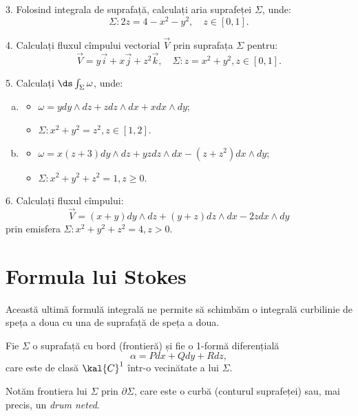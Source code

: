 3. Folosind integrala de suprafață, calculați aria suprafeței $ \Sigma $, unde:
\[
  \Sigma : 2z = 4 - x^2 - y^2, \quad z \in [0, 1].
\]

\vspace{0.5cm}

4. Calculați fluxul cîmpului vectorial $ \vec{V} $ prin suprafața $ \Sigma $
pentru:
\[
  \vec{V} = y\vec{i} + x\vec{j} + z^2 \vec{k}, \quad %
  \Sigma : z = x^2 + y^2, z \in [0, 1].
\]

\vspace{0.5cm}

5. Calculați $ \ds\int_\Sigma \omega $, unde:
\begin{enumerate}[(a)]
\item
  \begin{itemize}
  \item $ \omega = y dy \wedge dz + z dz \wedge dx + x dx \wedge dy $;
  \item $ \Sigma : x^2 + y^2 = z^2, z \in [1, 2] $.
  \end{itemize}
\item
  \begin{itemize}
  \item $ \omega = x(z + 3) dy \wedge dz + yz dz \wedge dx - %
    (z + z^2) dx \wedge dy $;
  \item $ \Sigma : x^2 + y^2 + z^2 = 1, z \geq 0 $.
  \end{itemize}
\end{enumerate}

\vspace{0.5cm}

6. Calculați fluxul cîmpului:
\[
  \vec{V} = (x + y) dy \wedge dz + (y + z) dz \wedge dx -2z dx \wedge dy
\]
prin emisfera $ \Sigma: x^2 + y^2 + z^2 = 4, z > 0 $.


\section{Formula lui Stokes}
Această ultimă formulă integrală ne permite să schimbăm o integrală curbilinie
de speța a doua cu una de suprafață de speța a doua.

Fie $ \Sigma $ o suprafață cu bord (frontieră) și fie o 1-formă diferențială
\[
  \alpha = Pdx + Qdy + Rdz,
\]
care este de clasă $ \kal{C}^1 $ într-o vecinătate a lui $ \Sigma $.

Notăm frontiera lui $ \Sigma $ prin $ \partial \Sigma $, care este o
curbă (conturul suprafeței) sau, mai precis, un \emph{drum neted}.

